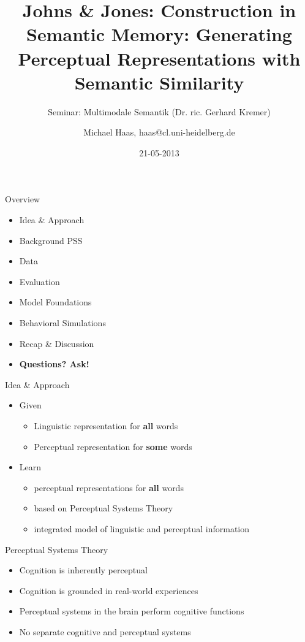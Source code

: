 \documentclass[12pt,a4paper]{beamer}
\author{Michael Haas, haas@cl.uni-heidelberg.de}
\title{Johns \& Jones: Construction in Semantic Memory: Generating Perceptual Representations with Semantic Similarity}
\subtitle{Seminar: Multimodale Semantik (Dr. ric. Gerhard Kremer)}
\date{21-05-2013}
\begin{document}
\begin{frame}
\maketitle
\end{frame}

\begin{frame}{Overview}
\begin{itemize}
\item Idea \& Approach %
\item Background PSS
\item Data
\item Evaluation
    \item Model Foundations
    \item Behavioral Simulations
\item Recap \& Discussion
\item \textbf{Questions? Ask!}
\end{itemize}
\end{frame}


\begin{frame}{Idea \& Approach}
\begin{itemize}
\item Given
    \begin{itemize}
    \item Linguistic representation for \textbf{all} words
    \item Perceptual representation for \textbf{some} words
    \end{itemize}
\item Learn
    \begin{itemize}
    \item perceptual representations for \textbf{all} words
    \item based on Perceptual Systems Theory
    \item integrated model of linguistic and perceptual information
    \end{itemize}
\end{itemize}
\end{frame}

\begin{frame}{Perceptual Systems Theory}
\begin{itemize}
\item Cognition is inherently perceptual
\item Cognition is grounded in real-world experiences
\item Perceptual systems in the brain perform cognitive functions
\item No separate cognitive and perceptual systems
\end{itemize}
\end{frame}
\end{document}
